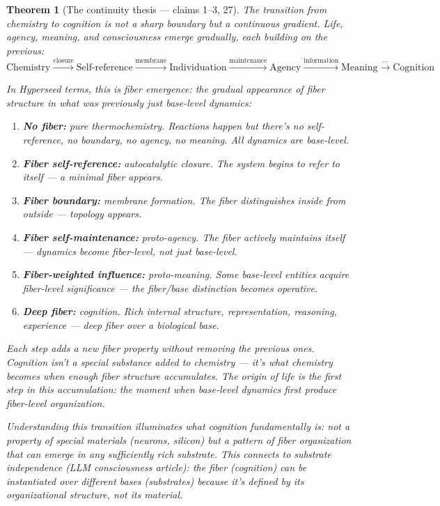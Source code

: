 \documentclass[11pt,a4paper]{article}
\newtheorem{theorem}[definition]{Theorem}
\begin{document}
\begin{theorem}[The continuity thesis --- claims 1--3, 27]
\label{thm:emergence}
The transition from chemistry to cognition is not a sharp boundary
but a continuous gradient. Life, agency, meaning, and consciousness
emerge gradually, each building on the previous:
\[
  \text{Chemistry} \xrightarrow{\text{closure}} \text{Self-reference}
  \xrightarrow{\text{membrane}} \text{Individuation}
  \xrightarrow{\text{maintenance}} \text{Agency}
  \xrightarrow{\text{information}} \text{Meaning}
  \xrightarrow{\cdots} \text{Cognition}
\]

In Hyperseed terms, this is \emph{fiber emergence}: the gradual
appearance of fiber structure in what was previously just base-level
dynamics:
\begin{enumerate}
\item \textbf{No fiber:} pure thermochemistry. Reactions happen but
  there's no self-reference, no boundary, no agency, no meaning.
  All dynamics are base-level.
\item \textbf{Fiber self-reference:} autocatalytic closure. The system
  begins to refer to itself --- a minimal fiber appears.
\item \textbf{Fiber boundary:} membrane formation. The fiber
  distinguishes inside from outside --- topology appears.
\item \textbf{Fiber self-maintenance:} proto-agency. The fiber
  actively maintains itself --- dynamics become fiber-level, not
  just base-level.
\item \textbf{Fiber-weighted influence:} proto-meaning. Some base-level
  entities acquire fiber-level significance --- the fiber/base
  distinction becomes operative.
\item \textbf{Deep fiber:} cognition. Rich internal structure,
  representation, reasoning, experience --- deep fiber over a
  biological base.
\end{enumerate}

Each step adds a new fiber property without removing the previous
ones. Cognition isn't a special substance added to chemistry ---
it's what chemistry becomes when enough fiber structure accumulates.
The origin of life is the first step in this accumulation: the
moment when base-level dynamics first produce fiber-level organization.

Understanding this transition illuminates what cognition
\emph{fundamentally is}: not a property of special materials (neurons,
silicon) but a pattern of fiber organization that can emerge in any
sufficiently rich substrate. This connects to substrate independence
(LLM consciousness article): the fiber (cognition) can be instantiated
over different bases (substrates) because it's defined by its
organizational structure, not its material.
\end{theorem}
\end{document}
